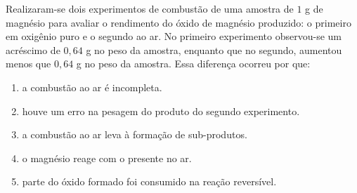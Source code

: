 Realizaram-se dois experimentos de combustão de uma amostra de $1$ g de magnésio para avaliar o rendimento do óxido de magnésio produzido: o primeiro em oxigênio puro e o segundo ao ar. No primeiro experimento observou-se um acréscimo de $0,64$ g no peso da amostra, enquanto que no segundo, aumentou menos que $0,64$ g no peso da amostra.
Essa diferença ocorreu por que:
\begin{enumerate}[label=(\alph*)]
	\item a combustão ao ar é incompleta.
	\item houve um erro na pesagem do produto do segundo experimento.
	\item a combustão ao ar leva à formação de sub-produtos.
	\item o magnésio reage com o  presente no ar.
	\item parte do óxido formado foi consumido na reação reversível.
\end{enumerate}
